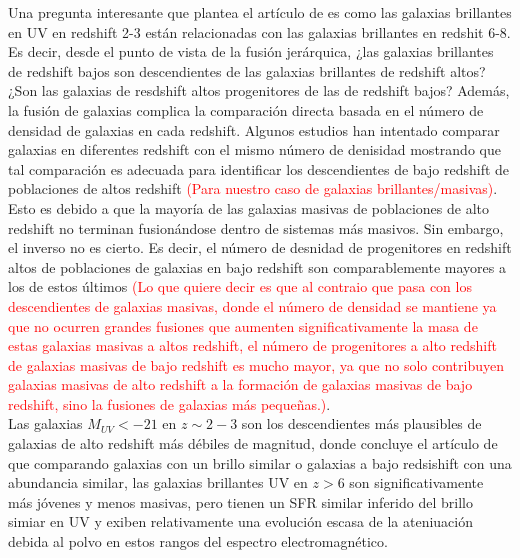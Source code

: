 \documentclass{article}
\begin{document}
Una pregunta interesante que plantea el artículo de \cite{finkelstein2015increasing} es como las galaxias brillantes en UV en redshift 2-3 están relacionadas con las galaxias brillantes en redshit 6-8. Es decir, desde el punto de vista de la fusión jerárquica, ¿las galaxias brillantes de redshift bajos son descendientes de las galaxias brillantes de redshift altos? ¿Son las galaxias de resdshift altos progenitores de las de redshift bajos? Además, la fusión de galaxias complica la comparación directa basada en el número de densidad de galaxias en cada redshift. Algunos estudios han intentado comparar galaxias en diferentes redshift con el mismo número de denisidad mostrando que tal comparación es adecuada para identificar los descendientes de bajo redshift de poblaciones de altos redshift \textcolor{red}{(Para nuestro caso de galaxias brillantes/masivas)}. Esto es debido a que la mayoría de las galaxias masivas de poblaciones de alto redshift no terminan fusionándose dentro de sistemas más masivos. Sin embargo, el inverso no es cierto. Es decir, el número de desnidad de progenitores en redshift altos de poblaciones de galaxias en bajo redshift son comparablemente mayores a los de estos últimos \textcolor{red}{(Lo que quiere decir es que al contraio que pasa con los descendientes de galaxias masivas, donde el número de densidad se mantiene ya que no ocurren grandes fusiones que aumenten significativamente la masa de estas galaxias masivas a altos redshift, el número de progenitores a alto redshift de galaxias masivas de bajo redshift es mucho mayor, ya que no solo contribuyen galaxias masivas de alto redshift a la formación de galaxias masivas de bajo redshift, sino la fusiones de galaxias más pequeñas.)}.\\


Las galaxias $M_{UV}<-21$ en $z\sim 2-3$ son los descendientes más plausibles de galaxias de alto redshift más débiles de magnitud, donde concluye el artículo de \cite{finkelstein2015increasing} que comparando galaxias con un brillo similar o galaxias a bajo redsishift con una abundancia similar, las galaxias brillantes UV en $z>6$ son significativamente más jóvenes y menos masivas, pero tienen un SFR similar inferido del brillo simiar en UV y exiben relativamente una evolución escasa de la ateniuación debida al polvo en estos rangos del espectro electromagnético.\\
\end{document}
